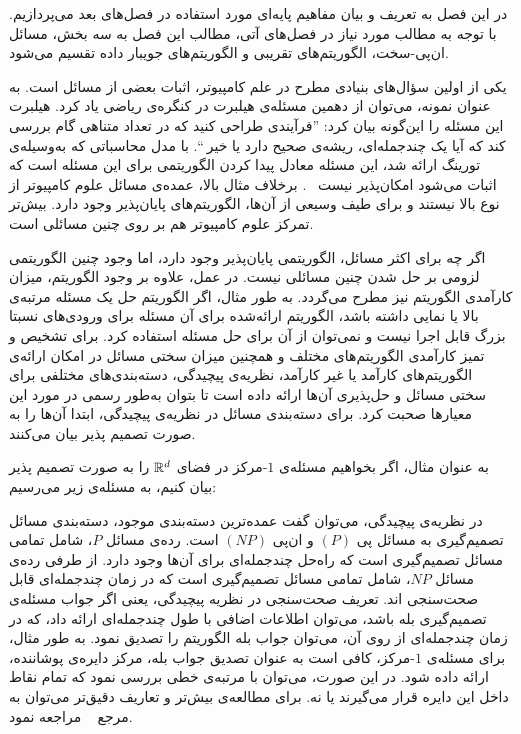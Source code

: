 

در این فصل به تعریف و بیان مفاهیم پایه‌ای مورد استفاده در فصل‌های بعد می‌پردازیم.
با توجه به مطالب مورد نیاز در فصل‌های آتی، مطالب این فصل به سه بخش، مسائل ان‌پی-سخت، الگوریتم‌های تقریبی و الگوریتم‌های جویبار داده تقسیم می‌شود.


یکی از اولین سؤال‌های بنیادی مطرح در علم کامپیوتر، اثبات  بعضی از مسائل است.
به عنوان نمونه، می‌توان از دهمین مسئله‌ی هیلبرت در کنگره‌ی ریاضی یاد کرد.
هیلبرت این مسئله را این‌گونه بیان کرد:‌ ''فرآیندی طراحی کنید که در تعداد متناهی گام بررسی کند که آیا یک چندجمله‌ای، ریشه‌ی صحیح دارد یا خیر ``. 
با مدل محاسباتی که به‌وسیله‌ی تورینگ ارائه شد، این مسئله معادل پیدا کردن الگوریتمی برای این مسئله است که اثبات می‌شود امکان‌پذیر نیست ~.
برخلاف مثال بالا، عمده‌ی مسائل علوم کامپیوتر از نوع بالا نیستند و برای طیف وسیعی از آن‌ها، الگوریتم‌های پایان‌پذیر وجود دارد.
بیش‌تر تمرکز علوم کامپیوتر هم بر روی چنین مسائلی است.

اگر چه برای اکثر مسائل، الگوریتمی پایان‌پذیر وجود دارد، اما وجود چنین الگوریتمی لزومی بر حل شدن چنین مسائلی نیست.
در عمل، علاوه بر وجود الگوریتم، میزان کارآمدی الگوریتم نیز مطرح می‌گردد.
به طور مثال، اگر الگوریتم حل یک مسئله مرتبه‌ی بالا یا نمایی داشته باشد، الگوریتم ارائه‌شده برای آن مسئله برای ورودی‌های نسبتا بزرگ قابل اجرا نیست و نمی‌توان از آن برای حل مسئله استفاده کرد.
برای تشخیص و تمیز کارآمدی الگوریتم‌های مختلف و همچنین میزان سختی مسائل در امکان ارائه‌ی الگوریتم‌های کارآمد یا غیر کارآمد، نظریه‌ی پیچیدگی، دسته‌بندی‌های مختلفی برای سختی مسائل و حل‌پذیری آن‌ها ارائه داده است تا بتوان به‌طور رسمی در مورد این معیارها صحبت کرد.
برای دسته‌بندی مسائل در نظریه‌ی پیچیدگی، ابتدا آن‌ها را به صورت تصمیم پذیر بیان می‌کنند.


به عنوان مثال، اگر بخواهیم مسئله‌ی $1$-مرکز در فضای $\mathbb{R}^d$ را به صورت تصمیم پذیر بیان کنیم، به مسئله‌ی زیر می‌رسیم:


در نظریه‌ی پیچیدگی، می‌توان گفت عمده‌ترین دسته‌بندی موجود، دسته‌بندی مسائل تصمیم‌گیری به مسائل پی $(P)$ و ان‌پی $(NP)$ است.
رده‌ی مسائل $P$، شامل تمامی مسائل تصمیم‌گیری است که راه‌حل چندجمله‌ای برای آن‌ها وجود دارد.
از طرفی رده‌ی مسائل $NP$، شامل تمامی مسائل تصمیم‌گیری است که در زمان چندجمله‌ای قابل صحت‌سنجی اند.
تعریف صحت‌سنجی در نظریه پیچیدگی، یعنی اگر جواب مسئله‌ی تصمیم‌گیری بله باشد، می‌توان اطلاعات اضافی با طول چندجمله‌ای ارائه داد، که در زمان چندجمله‌ای از روی آن، می‌توان جواب بله الگوریتم را تصدیق نمود.
به طور مثال، برای مسئله‌ی $1$-مرکز، کافی است به عنوان تصدیق جواب بله، مرکز دایره‌ی پوشاننده، ارائه داده شود.
در این صورت، می‌توان با مرتبه‌ی خطی بررسی نمود که تمام نقاط داخل این دایره قرار می‌گیرند یا نه.
برای مطالعه‌ی بیش‌تر و تعاریف دقیق‌تر می‌توان به مرجع ~ مراجعه نمود.

